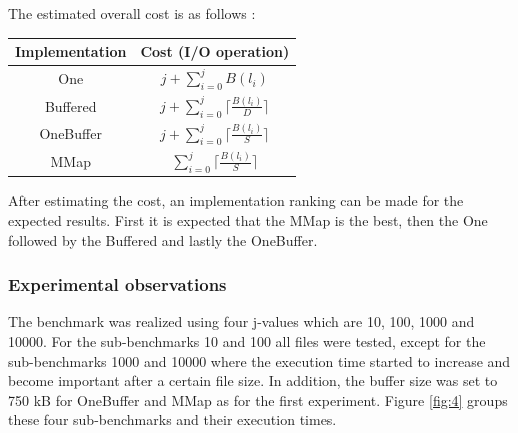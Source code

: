 \documentclass[12pt]{article}
\begin{document}
The estimated overall cost is as follows :

\begin{center}
\begin{tabular}{|c|c|}
\hline
\textbf{Implementation} & \textbf{Cost (I/O operation)}\\
\hline\hline
One & $j + \sum_{i=0}^{j} B(l_i)$\\
[5pt]\hline
Buffered &  $j + \sum_{i=0}^{j} \lceil\frac{B(l_i)}{D}\rceil$\\
[5pt]\hline
OneBuffer & $j + \sum_{i=0}^{j} \lceil\frac{B(l_i)}{S}\rceil$\\
[5pt]\hline
MMap & $\sum_{i=0}^{j} \lceil\frac{B(l_i)}{S}\rceil$\\
[5pt]\hline
\end{tabular}
\end{center}

After estimating the cost, an implementation ranking can be made for the expected results. First it is expected that the MMap is the best, then the One followed by the Buffered and lastly the OneBuffer.

\subsubsection{Experimental observations} \label{res1.2}
The benchmark was realized using four j-values which are 10, 100, 1000 and 10000. For the sub-benchmarks 10 and 100 all files were tested, except for the sub-benchmarks 1000 and 10000 where the execution time started to increase and become important after a certain file size. In addition, the buffer size was set to 750 kB for OneBuffer and MMap as for the first experiment. Figure \ref{fig:4} groups these four sub-benchmarks and their execution times. 
\end{document}
